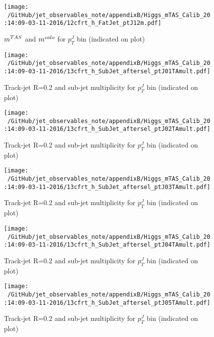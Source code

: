 \begin{figure}
 
\texttt{[image: ~/GitHub/jet\_observables\_note/appendixB/Higgs\_mTAS\_Calib\_20:14:09-03-11-2016/12cfrt\_h\_FatJet\_ptJ12m.pdf]}
\caption{$m^{TAS}$ and $m^{calo}$ for $p_{T}^{J}$ bin (indicated on plot) }
 
\end{figure}
\clearpage %
\begin{figure}
 
\texttt{[image: ~/GitHub/jet\_observables\_note/appendixB/Higgs\_mTAS\_Calib\_20:14:09-03-11-2016/13cfrt\_h\_SubJet\_aftersel\_ptJ01TAmult.pdf]}
\caption{Track-jet R=0.2 and sub-jet multiplicity for $p_{T}^{J}$ bin (indicated on plot) }
 
\end{figure}
 
\begin{figure}
 
\texttt{[image: ~/GitHub/jet\_observables\_note/appendixB/Higgs\_mTAS\_Calib\_20:14:09-03-11-2016/13cfrt\_h\_SubJet\_aftersel\_ptJ02TAmult.pdf]}
\caption{Track-jet R=0.2 and sub-jet multiplicity for $p_{T}^{J}$ bin (indicated on plot) }
 
\end{figure}
 
\begin{figure}
 
\texttt{[image: ~/GitHub/jet\_observables\_note/appendixB/Higgs\_mTAS\_Calib\_20:14:09-03-11-2016/13cfrt\_h\_SubJet\_aftersel\_ptJ03TAmult.pdf]}
\caption{Track-jet R=0.2 and sub-jet multiplicity for $p_{T}^{J}$ bin (indicated on plot) }
 
\end{figure}
 
\begin{figure}
 
\texttt{[image: ~/GitHub/jet\_observables\_note/appendixB/Higgs\_mTAS\_Calib\_20:14:09-03-11-2016/13cfrt\_h\_SubJet\_aftersel\_ptJ04TAmult.pdf]}
\caption{Track-jet R=0.2 and sub-jet multiplicity for $p_{T}^{J}$ bin (indicated on plot) }
 
\end{figure}
 
\begin{figure}
 
\texttt{[image: ~/GitHub/jet\_observables\_note/appendixB/Higgs\_mTAS\_Calib\_20:14:09-03-11-2016/13cfrt\_h\_SubJet\_aftersel\_ptJ05TAmult.pdf]}
\caption{Track-jet R=0.2 and sub-jet multiplicity for $p_{T}^{J}$ bin (indicated on plot) }
 
\end{figure}
 

